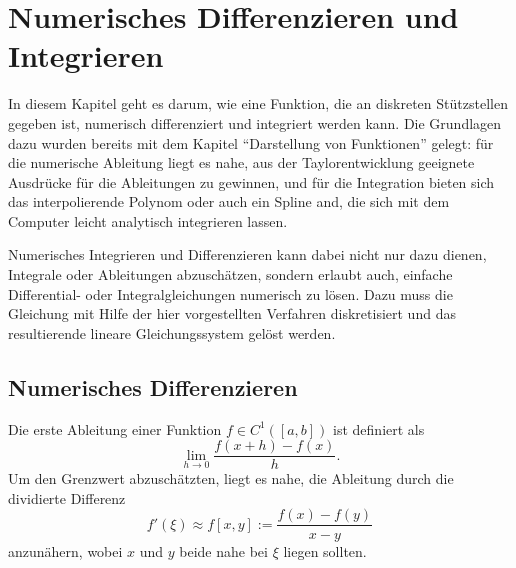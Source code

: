 % 

\chapter{Numerisches Differenzieren und Integrieren}

In diesem Kapitel geht es darum, wie eine Funktion, die an diskreten
Stützstellen gegeben ist, numerisch differenziert und integriert
werden kann. Die Grundlagen dazu wurden bereits mit dem Kapitel
``Darstellung von Funktionen'' gelegt: für die numerische Ableitung
liegt es nahe, aus der Taylorentwicklung geeignete Ausdrücke für die
Ableitungen zu gewinnen, und für die Integration bieten sich das
interpolierende Polynom oder auch ein Spline and, die sich mit dem
Computer leicht analytisch integrieren lassen.

Numerisches Integrieren und Differenzieren kann dabei nicht nur dazu
dienen, Integrale oder Ableitungen abzuschätzen, sondern erlaubt auch,
einfache Differential- oder Integralgleichungen numerisch zu
lösen. Dazu muss die Gleichung mit Hilfe der hier vorgestellten
Verfahren diskretisiert und das resultierende lineare Gleichungssystem
gelöst werden.

\section{Numerisches Differenzieren}

Die erste Ableitung einer Funktion $f\in C^1([a,b])$ ist definiert als
\begin{equation}
  \lim_{h\to 0} \frac{f(x+h) - f(x)}{h}.
\end{equation}
Um den Grenzwert abzuschätzten, liegt es nahe, die Ableitung durch die
dividierte Differenz
\begin{equation}
  f'(\xi) \approx f[x,y] := \frac{f(x) - f(y)}{x - y}
\end{equation}
anzunähern, wobei $x$ und $y$ beide nahe bei $\xi$ liegen sollten.

